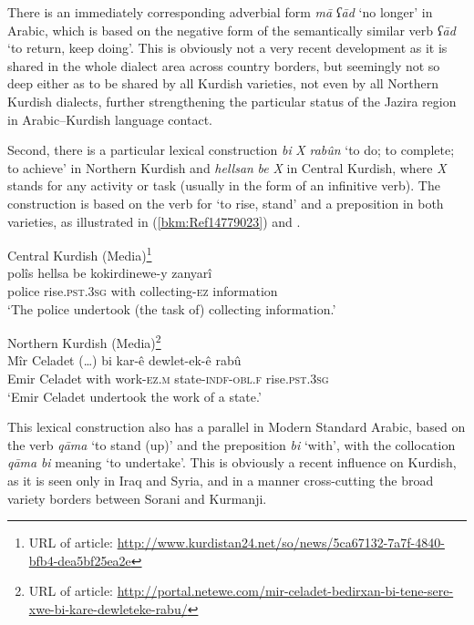 \documentclass[output=paper]{langsci/langscibook}
\begin{document}
There is an immediately corresponding adverbial form \textit{mā} \textit{ʕād} ‘no longer’ in Arabic, which is based on the negative form of the semantically similar verb \textit{ʕād} ‘to return, keep doing’. This is obviously not a very recent development as it is shared in the whole dialect area across country borders, but seemingly not so deep either as to be shared by all Kurdish varieties, not even by all Northern Kurdish dialects, further strengthening the particular status of the Jazira region in Arabic--Kurdish language contact. 

Second, there is a particular lexical construction \textit{bi} \textit{X} \textit{rabûn} ‘to do; to complete; to achieve’ in Northern Kurdish and \textit{hellsan} \textit{be} \textit{X} in Central Kurdish, where \textit{X} stands for any activity or task (usually in the form of an infinitive verb). The construction is based on the verb for ‘to rise, stand’ and a preposition in both varieties, as illustrated in (\ref{bkm:Ref14779023}) and .

\ea Central Kurdish (Media)\label{bkm:Ref14779023}\footnote{URL of article: \url{http://www.kurdistan24.net/so/news/5ca67132-7a7f-4840-bfb4-dea5bf25ea2e}}\\
\gll polîs hellsa be kokirdinewe-y zanyarî\\
     police rise.\textsc{pst.3sg} with collecting-\textsc{ez} information\\
\glt ‘The police undertook (the task of) collecting information.’\z

\ea\label{17} Northern Kurdish (Media)\footnote{URL of article: \url{http://portal.netewe.com/mir-celadet-bedirxan-bi-tene-sere-xwe-bi-kare-dewleteke-rabu/}}\\
\gll Mîr {Celadet (…)} bi kar-ê dewlet-ek-ê rabû\\
     Emir Celadet with work-\textsc{ez.m} state-\textsc{indf-obl.f} rise.\textsc{pst.3sg}       \\
\glt ‘Emir Celadet undertook the work of a state.’\z

This lexical construction also has a parallel in Modern Standard Arabic, based on the verb \textit{qāma} ‘to stand (up)’ and the preposition \textit{bi} ‘with’, with the collocation \textit{qāma} \textit{bi} meaning ‘to undertake’. This is obviously a recent influence on Kurdish, as it is seen only in Iraq and Syria, and in a manner cross-cutting the broad variety borders between Sorani and Kurmanji. 
\end{document}
